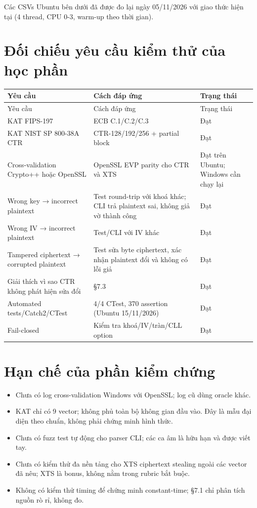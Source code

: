 \documentclass[12pt,a4paper,oneside]{report}
\begin{document}
Các CSVs Ubuntu bên dưới đã được đo lại ngày 05/11/2026 với giao thức hiện tại (4 thread, CPU 0-3, warm-up theo thời gian).


\section{Đối chiếu yêu cầu kiểm thử của học phần}


\begin{longtable}{p{}p{}p{}}
\toprule
Yêu cầu & Cách đáp ứng & Trạng thái \\
\midrule
\endfirsthead
\toprule
Yêu cầu & Cách đáp ứng & Trạng thái \\
\midrule
\endhead
KAT FIPS-197 & ECB C.1/C.2/C.3 & Đạt \\
KAT NIST SP 800-38A CTR & CTR-128/192/256 + partial block & Đạt \\
Cross-validation Crypto++ hoặc OpenSSL & OpenSSL EVP parity cho CTR và XTS & Đạt trên Ubuntu; Windows cần chạy lại \\
Wrong key → incorrect plaintext & Test round-trip với khoá khác; CLI trả plaintext sai, không giả vờ thành công & Đạt \\
Wrong IV → incorrect plaintext & Test/CLI với IV khác & Đạt \\
Tampered ciphertext → corrupted plaintext & Test sửa byte ciphertext, xác nhận plaintext đổi và không có lỗi giả & Đạt \\
Giải thích vì sao CTR không phát hiện sửa đổi & §7.3 & Đạt \\
Automated tests/Catch2/CTest & 4/4 CTest, 370 assertion (Ubuntu 15/11/2026) & Đạt \\
Fail-closed & Kiểm tra khoá/IV/tràn/CLL option & Đạt \\
\bottomrule
\end{longtable}


\section{Hạn chế của phần kiểm chứng}


\begin{itemize}[leftmargin=*]
\item Chưa có log cross-validation Windows với OpenSSL; log cũ dùng oracle khác.
\item KAT chỉ có 9 vector; không phủ toàn bộ không gian đầu vào. Đây là mẫu đại diện theo chuẩn, không phải chứng minh hình thức.
\item Chưa có fuzz test tự động cho parser CLI; các ca âm là hữu hạn và được viết tay.
\item Chưa có kiểm thử đa nền tảng cho XTS ciphertext stealing ngoài các vector đã nêu; XTS là bonus, không nằm trong rubric bắt buộc.
\item Không có kiểm thử timing để chứng minh constant-time; §7.1 chỉ phân tích nguồn rò rỉ, không đo.
\end{itemize}
\end{document}
